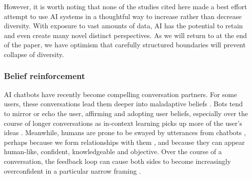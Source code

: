 \documentclass[12pt]{article}
\begin{document}

However, it is worth noting that none of the studies cited here made a best effort attempt to use AI systems in a thoughtful way to increase rather than decrease diversity. With exposure to vast amounts of data, AI has the potential to retain and even create many novel distinct perspectives. As we will return to at the end of the paper, we have optimism that carefully structured boundaries will prevent collapse of diversity.






\subsubsection{Belief reinforcement} 

AI chatbots have recently become compelling conversation partners. For some users, these conversations lead them deeper into maladaptive beliefs \citep{tiku2025psychosis, morrin2025delusions, ostergaard2025generative, yeung2025psychogenic}. Bots tend to mirror or echo the user, affirming and adopting user beliefs, especially over the course of longer conversations as in-context learning picks up more of the user's ideas \citep{shanahan2023role, perez2022discovering, sharma2023sycophancy, weilnhammer2026vulnerability, cheng2026sycophantic}. Meanwhile, humans are prone to be swayed by utterances from chatbots \citep{costello2024durably, luettgau2025people, potter2024hidden}, perhaps because we form relationships with them \citep{kirk2025human}, and because they can appear human-like, confident, knowledgeable and objective. Over the course of a conversation, the feedback loop can cause both sides to become increasingly overconfident in a particular narrow framing \citep{dohnany2026technological}. 
\end{document}
